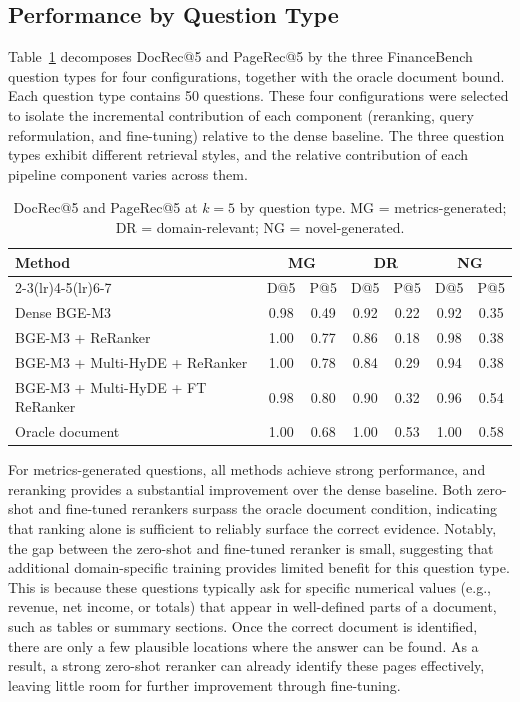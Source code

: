 \documentclass[12pt,twoside,maitrise]{dms}
\theoremstyle{definition}
\numberwithin{equation}{section}
\numberwithin{table}{chapter}
\numberwithin{figure}{chapter}
\begin{document}
\subsection{Performance by Question Type}
\label{sec:qtype_retrieval}

Table~\ref{tab:qtype} decomposes DocRec@5 and PageRec@5 by the three FinanceBench
question types for four configurations, together with the oracle document
bound.  Each question type contains 50 questions.  These four configurations were selected
to isolate the incremental contribution of each component (reranking, query reformulation,
and fine-tuning) relative to the dense baseline. The three question types exhibit different retrieval styles, and the relative
contribution of each pipeline component varies across them.


\begin{table}[ht]
\centering
\caption{DocRec@5 and PageRec@5 at $k=5$ by question type.
  MG = metrics-generated; DR = domain-relevant; NG = novel-generated.}
\label{tab:qtype}
\small
\begin{tabular}{lcccccc}
\toprule
\multirow{2}{*}{\textbf{Method}}
  & \multicolumn{2}{c}{\textbf{MG}} & \multicolumn{2}{c}{\textbf{DR}}
  & \multicolumn{2}{c}{\textbf{NG}} \\
\cmidrule(lr){2-3}\cmidrule(lr){4-5}\cmidrule(lr){6-7}
  & D@5 & P@5 & D@5 & P@5 & D@5 & P@5 \\
\midrule
Dense BGE-M3                       & 0.98 & 0.49 & 0.92 & 0.22 & 0.92 & 0.35 \\
BGE-M3 + ReRanker                  & 1.00 & 0.77 & 0.86 & 0.18 & 0.98 & 0.38 \\
BGE-M3 + Multi-HyDE + ReRanker    & 1.00 & 0.78 & 0.84 & 0.29 & 0.94 & 0.38 \\
BGE-M3 + Multi-HyDE + FT ReRanker & 0.98 & 0.80 & 0.90 & 0.32 & 0.96 &0.54 \\
\midrule
Oracle document                    & 1.00 & 0.68 & 1.00 & 0.53 & 1.00 & 0.58 \\
\bottomrule
\end{tabular}
\end{table}


For metrics-generated questions, all methods achieve strong performance, and reranking
provides a substantial improvement over the dense baseline. Both zero-shot and fine-tuned
rerankers surpass the oracle document condition, indicating that ranking alone is sufficient
to reliably surface the correct evidence. Notably, the gap between the zero-shot and
fine-tuned reranker is small, suggesting that additional domain-specific training provides
limited benefit for this question type.  This is because these questions typically ask for specific numerical values (e.g., revenue,
net income, or totals) that appear in well-defined parts of a document, such as tables or
summary sections. Once the correct document is identified, there are only a few plausible
locations where the answer can be found. As a result, a strong zero-shot reranker can already
identify these pages effectively, leaving little room for further improvement through
fine-tuning.
\end{document}
